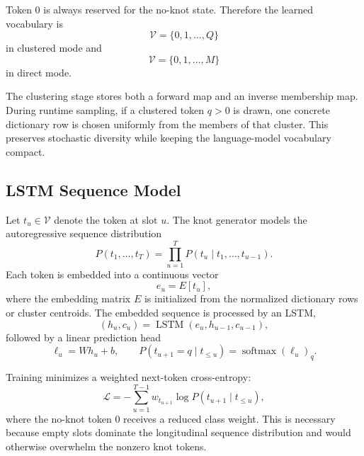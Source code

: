 \documentclass[11pt]{article}
\begin{document}
Token $0$ is always reserved for the no-knot state. Therefore the learned vocabulary is
\begin{equation}
\mathcal{V} = \{0,1,\ldots,Q\}
\end{equation}
in clustered mode and
\begin{equation}
\mathcal{V} = \{0,1,\ldots,M\}
\end{equation}
in direct mode.

The clustering stage stores both a forward map and an inverse membership map. During runtime sampling, if a
clustered token $q > 0$ is drawn, one concrete dictionary row is chosen uniformly from the members of that
cluster. This preserves stochastic diversity while keeping the language-model vocabulary compact.

\subsection{LSTM Sequence Model}

Let $t_u \in \mathcal{V}$ denote the token at slot $u$. The knot generator models the autoregressive sequence
distribution
\begin{equation}
P(t_1,\ldots,t_T) = \prod_{u=1}^{T} P\!\left(t_u \mid t_1,\ldots,t_{u-1}\right).
\end{equation}
Each token is embedded into a continuous vector
\begin{equation}
e_u = E[t_u],
\end{equation}
where the embedding matrix $E$ is initialized from the normalized dictionary rows or cluster centroids. The
embedded sequence is processed by an LSTM,
\begin{equation}
(h_u, c_u) = \operatorname{LSTM}(e_u, h_{u-1}, c_{u-1}),
\end{equation}
followed by a linear prediction head
\begin{equation}
\ell_u = W h_u + b,
\qquad
P(t_{u+1} = q \mid t_{\le u}) = \operatorname{softmax}(\ell_u)_q.
\end{equation}

Training minimizes a weighted next-token cross-entropy:
\begin{equation}
\mathcal{L}
=
- \sum_{u=1}^{T-1}
w_{t_{u+1}}
\log P(t_{u+1} \mid t_{\le u}),
\end{equation}
where the no-knot token $0$ receives a reduced class weight. This is necessary because empty slots dominate the
longitudinal sequence distribution and would otherwise overwhelm the nonzero knot tokens.
\end{document}
